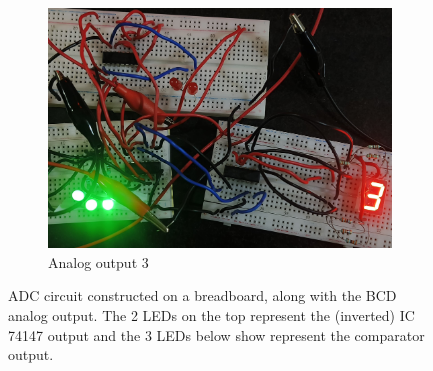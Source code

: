 \begin{figure}[H]
    \bigskip
    \begin{subfigure}{\linewidth}
    \includegraphics[width=1\textwidth]{images/3.jpg}
    \caption{Analog output 3}
    \end{subfigure}
            
    \caption{ADC circuit constructed on a breadboard, along with the BCD analog output. The 2 LEDs on the top represent the (inverted) IC 74147 output and the 3 LEDs below show represent the comparator output. }
    \label{f2}
\end{figure}